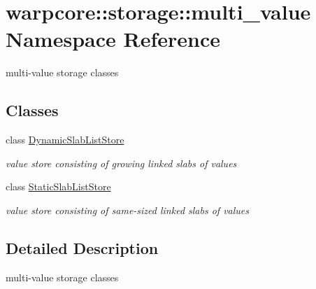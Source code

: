 \hypertarget{namespacewarpcore_1_1storage_1_1multi__value}{}\section{warpcore\+:\+:storage\+:\+:multi\+\_\+value Namespace Reference}
\label{namespacewarpcore_1_1storage_1_1multi__value}


multi-\/value storage classes  


\subsection*{Classes}
\begin{DoxyCompactItemize}
\item 
class \hyperlink{classwarpcore_1_1storage_1_1multi__value_1_1DynamicSlabListStore}{Dynamic\+Slab\+List\+Store}
\begin{DoxyCompactList}\small\item\em value store consisting of growing linked slabs of values \end{DoxyCompactList}\item 
class \hyperlink{classwarpcore_1_1storage_1_1multi__value_1_1StaticSlabListStore}{Static\+Slab\+List\+Store}
\begin{DoxyCompactList}\small\item\em value store consisting of same-\/sized linked slabs of values \end{DoxyCompactList}\end{DoxyCompactItemize}


\subsection{Detailed Description}
multi-\/value storage classes 